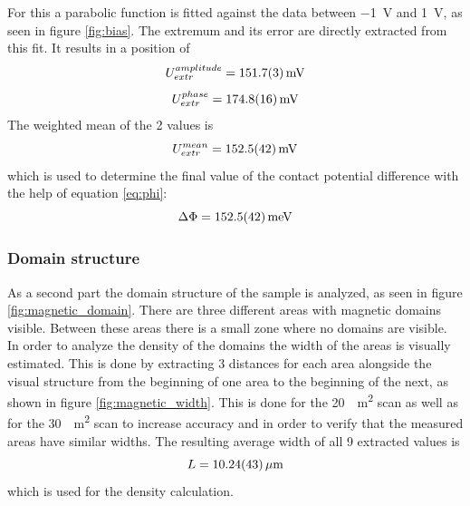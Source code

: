 \documentclass[%
 reprint,
amsmath,amssymb,
pra,
]{revtex4-1}
\begin{document}
For this a parabolic function is fitted against the data between \SI{-1}{V} and \SI{1}{V}, as seen in figure \ref{fig:bias}. The extremum and its error are directly extracted from this fit. It results in a position of
\begin{equation*}
U_{extr}^{amplitude} = \SI{151.7 \pm 0.3}{mV}
\end{equation*}
\begin{equation*}
U_{extr}^{phase} = \SI{174.8 \pm 1.6}{mV}
\end{equation*}
The weighted mean of the 2 values is
\begin{equation*}
U_{extr}^{mean} = \SI{152.5 \pm 4.2}{mV}
\end{equation*}
which is used to determine the final value of the contact potential difference with the help of equation \ref{eq:phi}:
\begin{equation*}
\Delta\Phi = \SI{152.5 \pm 4.2}{meV}
\end{equation*}

\subsubsection{Domain structure}
As a second part the domain structure of the sample is analyzed, as seen in figure \ref{fig:magnetic_domain}. There are three different areas with magnetic domains visible. Between these areas there is a small zone where no domains are visible.\\
In order to analyze the density of the domains the width of the areas is visually estimated. This is done by extracting 3 distances for each area alongside the visual structure from the beginning of one area to the beginning of the next, as shown in figure \ref{fig:magnetic_width}. 
This is done for the \SI{20}{\mu m^2} scan as well as for the \SI{30}{\mu m^2} scan to increase accuracy and in order to verify that the measured areas have similar widths. The resulting average width of all 9 extracted values is
\begin{equation}
L = \SI{10.24 \pm 0.43}{\mu m}
\end{equation}
which is used for the density calculation.
\end{document}
